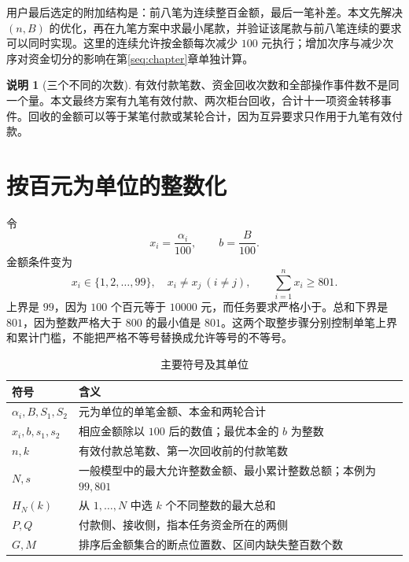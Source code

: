 \documentclass[UTF8,a4paper]{ctexbook}
\theoremstyle{definition}
\newtheorem{remark}[theorem]{说明}
\numberwithin{equation}{chapter}
\newcommand{\1}{\mathbf{1}}
\begin{document}
用户最后选定的附加结构是：前八笔为连续整百金额，最后一笔补差。本文先解决 $(n,B)$ 的优化，再在九笔方案中求最小尾款，并验证该尾款与前八笔连续的要求可以同时实现。这里的连续允许按金额每次减少 $100$ 元执行；增加次序与减少次序对资金切分的影响在第\ref{seq:chapter}章单独计算。

\begin{remark}[三个不同的次数]
有效付款笔数、资金回收次数和全部操作事件数不是同一个量。本文最终方案有九笔有效付款、两次柜台回收，合计十一项资金转移事件。回收的金额可以等于某笔付款或某轮合计，因为互异要求只作用于九笔有效付款。
\end{remark}

\section{按百元为单位的整数化}
令
\[
x_i=\frac{\alpha_i}{100},\qquad b=\frac{B}{100}.
\]
金额条件变为
\begin{equation}\label{model:integer}
x_i\in\{1,2,\ldots,99\},\quad x_i\ne x_j\ (i\ne j),
\qquad \sum_{i=1}^{n}x_i\ge801.
\end{equation}
上界是 $99$，因为 $100$ 个百元等于 $10000$ 元，而任务要求严格小于。总和下界是 $801$，因为整数严格大于 $800$ 的最小值是 $801$。这两个取整步骤分别控制单笔上界和累计门槛，不能把严格不等号替换成允许等号的不等号。

\begin{table}[htbp]
\centering
\caption{主要符号及其单位}
\begin{tabularx}{\textwidth}{@{}lX@{}}
\toprule
符号 & 含义\\
\midrule
$\alpha_i,B,S_1,S_2$ & 元为单位的单笔金额、本金和两轮合计\\
$x_i,b,s_1,s_2$ & 相应金额除以 $100$ 后的数值；最优本金的 $b$ 为整数\\
$n,k$ & 有效付款总笔数、第一次回收前的付款笔数\\
$N,s$ & 一般模型中的最大允许整数金额、最小累计整数总额；本例为 $99,801$\\
$H_N(k)$ & 从 $1,\ldots,N$ 中选 $k$ 个不同整数的最大总和\\
$P,Q$ & 付款侧、接收侧，指本任务资金所在的两侧\\
$G,M$ & 排序后金额集合的断点位置数、区间内缺失整百数个数\\
\bottomrule
\end{tabularx}
\end{table}
\end{document}
